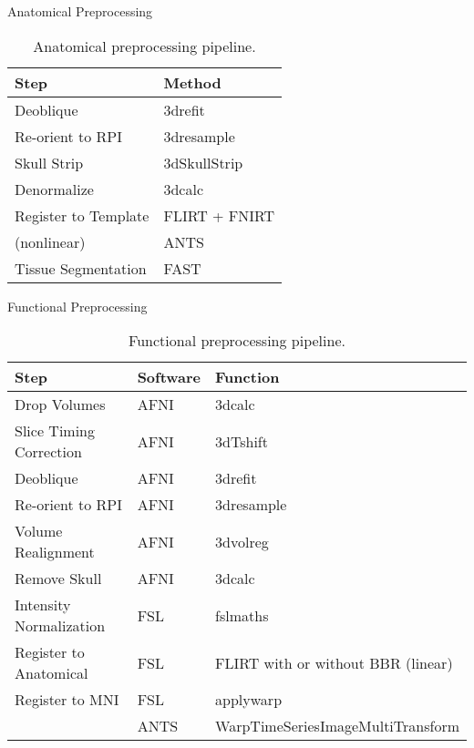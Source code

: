 Anatomical Preprocessing \\


\begin{table}[h]
	\caption{Anatomical preprocessing pipeline.}
    \begin{tabular}{l l}
	    \hline
	    Step & Method  \\
	    \hline
	    Deoblique & 3drefit \cite{Cox1996}  \\
	    Re-orient to RPI & 3dresample \cite{Cox1996} \\
	    Skull Strip & 3dSkullStrip \cite{Cox1996} \\
	    Denormalize & 3dcalc \cite{Cox1996} \\
	    Register to Template & FLIRT \cite{Jenkinson2002} + FNIRT \cite{Andersson2007} \\
	    (nonlinear) & ANTS \cite{Avants2009}  \\
	    Tissue Segmentation & FAST \cite{Zhang2001} \\ 
	    \hline
    \end{tabular}
\end{table}


Functional Preprocessing \\


\begin{table}[h]
    \caption{Functional preprocessing pipeline.}
    \begin{tabular}{l l l}
	    \hline
	    Step & Software  & Function \\ \hline
	    Drop Volumes & AFNI & 3dcalc \cite{Cox1996}\\
	    Slice Timing Correction & AFNI & 3dTshift \cite{Cox1996} \\
	    Deoblique & AFNI & 3drefit \cite{Cox1996} \\
	    Re-orient to RPI & AFNI & 3dresample \cite{Cox1996} \\
	    Volume Realignment & AFNI & 3dvolreg \cite{Cox1996} \\
	    Remove Skull  & AFNI & 3dcalc \cite{Cox1996} \\
	    Intensity Normalization & FSL & fslmaths  \\
	    Register to Anatomical & FSL & FLIRT with or without BBR (linear) \cite{Jenkinson2002}\cite{Greve2009} \\
	    Register to MNI & FSL & applywarp \cite{Andersson2007} \\
	    & ANTS & WarpTimeSeriesImageMultiTransform \cite{Avants2009} \\ 
	    \hline
    \end{tabular}
\end{table}

